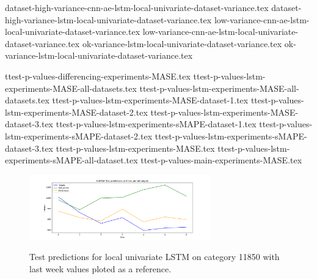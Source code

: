 {dataset-high-variance-cnn-ae-lstm-local-univariate-dataset-variance.tex}
{dataset-high-variance-lstm-local-univariate-dataset-variance.tex}
{low-variance-cnn-ae-lstm-local-univariate-dataset-variance.tex}
{low-variance-cnn-ae-lstm-local-univariate-dataset-variance.tex}
{ok-variance-lstm-local-univariate-dataset-variance.tex}
{ok-variance-lstm-local-univariate-dataset-variance.tex}

{ttest-p-values-differencing-experiments-MASE.tex}
{ttest-p-values-lstm-experiments-MASE-all-datasets.tex}
{ttest-p-values-lstm-experiments-MASE-all-datasets.tex}
{ttest-p-values-lstm-experiments-MASE-dataset-1.tex}
{ttest-p-values-lstm-experiments-MASE-dataset-2.tex}
{ttest-p-values-lstm-experiments-MASE-dataset-3.tex}
{ttest-p-values-lstm-experiments-sMAPE-dataset-1.tex}
{ttest-p-values-lstm-experiments-sMAPE-dataset-2.tex}
{ttest-p-values-lstm-experiments-sMAPE-dataset-3.tex}
{ttest-p-values-lstm-experiments-MASE.tex}
{ttest-p-values-lstm-experiments-sMAPE-all-dataset.tex}
{ttest-p-values-main-experiments-MASE.tex}


\begin{figure}
  \centering
  \caption{Test predictions for local univariate LSTM on category 11850 with last week values ploted as a reference.}
  \includegraphics[width=0.7\textwidth]{./figs/results/predictions/11850_Test_predictions_with_last_period_targets.png}
  \hfill
  \label{fig:results:predictions:11850-Test_predictions_with_last_period_targets.png}
\end{figure}

